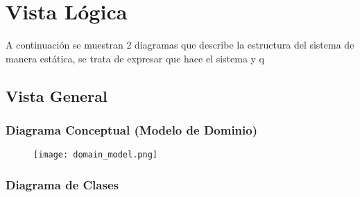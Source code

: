 \section{Vista Lógica} \label{vistaLogica}
A continuación se muestran 2 diagramas que describe la estructura del sistema de manera estática, se trata de expresar que hace el sistema y q
    \subsection{Vista General}

    \subsubsection{Diagrama Conceptual (Modelo de Dominio)}

    \begin{figure}[H]
        \texttt{[image: domain\_model.png]}
        \centering
    \end{figure}

    \subsubsection{Diagrama de Clases}